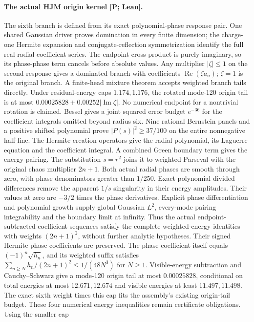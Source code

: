 \documentclass[11pt,a4paper]{article}
\begin{document}
\paragraph{The actual HJM origin kernel [P; Lean].}
The sixth branch is defined from its exact polynomial-phase response pair.
One shared Gaussian driver proves domination in every finite dimension; the
charge-one Hermite expansion and conjugate-reflection symmetrization identify
the full real radial coefficient series. The endpoint cross product is purely
imaginary, so its phase-phase term cancels before absolute values. Any
multiplier $|\zeta|\le1$ on the second response gives
a dominated branch with coefficients $\operatorname{Re}(\zeta a_n)$; $\zeta=1$
is the original branch. A finite-head mixture theorem accepts weighted branch
tails directly. Under residual-energy caps $1.174,1.176$, the rotated
mode-120 origin tail is at most $0.00025828+0.00252|\operatorname{Im}\zeta|$.
No numerical endpoint for a nontrivial rotation is claimed. Bessel gives
a joint squared error budget $e^{-36}$ for the coefficient integrals omitted
beyond radius six. Nine rational Bernstein panels and a positive shifted
polynomial prove $|P(s)|^2\ge37/100$ on the entire nonnegative half-line.
The Hermite creation operators give the radial polynomial, its Laguerre
equation and the coefficient integral. A combined Green boundary term gives
the energy pairing. The substitution $s=r^2$ joins it to weighted Parseval
with the original chaos multiplier $2n+1$. Both actual radial phases are smooth
through zero, with phase denominators greater than $1/250$. Exact polynomial
divided differences remove the apparent $1/s$ singularity in their energy
amplitudes. Their values at zero are $-3/2$ times the phase derivatives.
Explicit phase differentiation and polynomial growth supply global Gaussian
$L^2$, every-mode pairing integrability and the boundary limit at infinity.
Thus the actual endpoint-subtracted coefficient sequences satisfy the complete
weighted-energy identities with weights $(2n+1)^2$, without further analytic
hypotheses. Their signed Hermite phase coefficients are preserved.
The phase coefficient itself equals $(-1)^n\sqrt{h_n}$, and its weighted
suffix satisfies $\sum_{n\ge N}h_n/(2n+1)^2\le1/(48N^3)$ for $N\ge1$.
Visible-energy subtraction and Cauchy--Schwarz give a mode-120 origin tail
at most $0.00025828$, conditional on total energies at most $12.671,12.674$
and visible energies at least $11.497,11.498$. The exact sixth weight times
this cap fits the assembly's existing origin-tail budget. These four numerical
energy inequalities remain certificate obligations. Using the smaller cap
\end{document}
